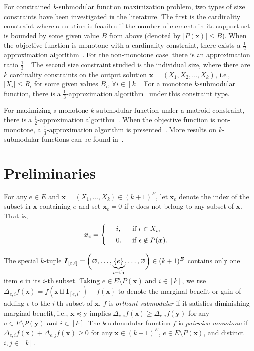\documentclass[preprint,12pt]{elsarticle}
\newcommand{\bbmat}{\left\{ \begin{array}}
\newcommand{\ebmat}{\end{array} \right. }
\def\bx{\boldsymbol{x}}
\def\by{\boldsymbol{y}}
\def\bI{\boldsymbol{I}}
\begin{document}
For constrained $k$-submodular function maximization problem,  two types of size constraints have been investigated in the literature.
The first is the cardinality constraint where a solution is feasible if the number of elements in its support set is bounded by some given value $B$ from above (denoted by $|P(\bx)|\leq B$). When the objective function is monotone with a cardinality constraint, there exists a $\frac{1}{2}$-approximation algorithm~\cite{NY}. For the non-monotone case, there is an approximation ratio $\frac{1}{3}$~\cite{NT}.
The second size constraint studied is the individual size, where there are $k$ cardinality constraints on the output solution $\bx=(X_1,X_2,\ldots,X_k)$, i.e., $|X_i|\leq B_i$ for some given values $B_i$, $\forall i\in [k]$. For a monotone $k$-submodular function, there is a $\frac{1}{3}$-approximation algorithm~\cite{NY} under this constraint type.

For maximizing a monotone $k$-submodular function under a matroid constraint, there is a $\frac{1}{2}$-approximation algorithm~\cite{RY2020,S}. When the objective function is non-monotone, a $\frac{1}{3}$-approximation algorithm is presented~\cite{SLL2022}.
More results on $k$-submodular functions can be found
in~\cite{CQDe,SGW,XLZL2022,YLZL2022,YLZL2023a,YLZL2023b,ZCLL}.

\section{Preliminaries}\label{pre}
For any $e\in E$ and $\bx=(X_1,\dots, X_k)\in (k+1)^E$,
let $\bx_e$ denote the index of the subset in $\bx$ containing $e$ and set $\bx_e=0$ if $e$ does not belong to any subset of $\bx$. That is,
\[
\bx_e=\bbmat{rll}
&i, \;\;& {\rm if}\;  e \in X_i, \\ [1ex]
&0, \; \;& {\rm if}\;  e \notin P(\bx).
\ebmat
\]

The special $k$-tuple $\bI_{[e, i]}=\bigg(\varnothing, \ldots, \underbrace{\{e\}}\limits_{i{\rm-th}}, \dots,\varnothing\bigg)\in (k+1)^E$ contains only one item $e$ in its $i$-th subset.
Taking $e\in E\setminus P(\bx)$ and $i\in [k]$, we use $\Delta_{e, i}f(\bx)=f(\bx \sqcup\bI_{[e,i]})-f(\bx)$ to denote the marginal benefit or gain of adding $e$ to the $i$-th subset of $\bx$. $f$ is \emph{orthant submodular} if it satisfies diminishing marginal benefit, i.e., $\bx\preceq\by$ implies $\Delta_{e, i}f(\bx)\ge\Delta_{e, i}f(\by)$ for any  $e\in E\setminus P(\by)$ and $i\in [k]$. %
The $k$-submodular function $f$ is \emph{pairwise monotone} if $\Delta_{e, i}f(\bx)+\Delta_{e, j}f(\bx)\ge0$ for any $\bx\in(k+1)^E$, $e\in E\setminus P(\bx)$, and distinct $i, j \in [k]$.
\end{document}
